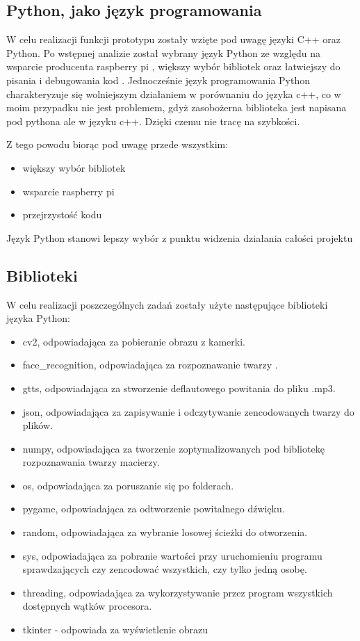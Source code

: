 \documentclass[a4paper,12pt,reqno]{article}
\begin{document}
\subsection{Python, jako język programowania}
W celu realizacji funkcji prototypu zostały wzięte pod uwagę języki C++ oraz Python. Po wstępnej analizie został wybrany język Python ze względu na wsparcie producenta raspberry pi \cite{watki_jak_pisac}, większy wybór bibliotek \cite{face_detection_and_recognition_using_opencv} oraz łatwiejszy do pisania i debugowania kod \cite{face_recognition_with_python}. Jednocześnie język programowania Python charakteryzuje się wolniejszym działaniem w porównaniu do języka c++, co w moim przypadku nie jest problemem, gdyż zasobożerna biblioteka jest napisana pod pythona ale w języku c++. Dzięki czemu nie tracę na szybkości.

Z tego powodu biorąc pod uwagę przede wszystkim:
\begin{itemize}
\item większy wybór bibliotek
\item wsparcie raspberry pi
\item przejrzystość kodu
\end{itemize}
Język Python stanowi lepszy wybór z punktu widzenia działania całości projektu
\subsection{Biblioteki}
W celu realizacji poszczególnych zadań zostały użyte następujące biblioteki języka Python:
\begin{itemize}
\item cv2, odpowiadająca za pobieranie obrazu z kamerki.
\item face\_recognition, odpowiadająca za rozpoznawanie twarzy \cite{face_recognition_github} \cite{face_recognition_implementation_on_raspberrypi} \cite{face_recognition_python}.
\item gtts, odpowiadająca za stworzenie deflautowego powitania do pliku .mp3.
\item json, odpowiadająca za zapisywanie i odczytywanie zencodowanych twarzy do plików.
\item numpy, odpowiadająca za tworzenie zoptymalizowanych pod bibliotekę rozpoznawania twarzy macierzy.
\item os, odpowiadająca za poruszanie się po folderach.
\item pygame, odpowiadająca za odtworzenie powitalnego dźwięku.
\item random, odpowiadająca za wybranie losowej ścieżki do otworzenia.
\item sys, odpowiadająca za pobranie wartości przy uruchomieniu programu sprawdzających czy zencodować wszystkich, czy tylko jedną osobę.
\item threading, odpowiadająca za wykorzystywanie przez program wszystkich dostępnych wątków procesora.
\item tkinter - odpowiada za wyświetlenie obrazu
\end{itemize}
\end{document}
